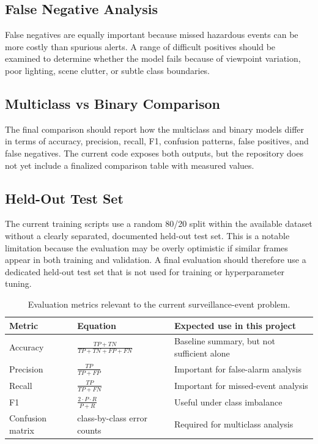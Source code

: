\documentclass[11pt,a4paper]{article}
\begin{document}
\subsection{False Negative Analysis}
False negatives are equally important because missed hazardous events can be more costly than spurious alerts. A range of difficult positives should be examined to determine whether the model fails because of viewpoint variation, poor lighting, scene clutter, or subtle class boundaries.

\subsection{Multiclass vs Binary Comparison}
The final comparison should report how the multiclass and binary models differ in terms of accuracy, precision, recall, F1, confusion patterns, false positives, and false negatives. The current code exposes both outputs, but the repository does not yet include a finalized comparison table with measured values.

\subsection{Held-Out Test Set}
The current training scripts use a random 80/20 split within the available dataset without a clearly separated, documented held-out test set. This is a notable limitation because the evaluation may be overly optimistic if similar frames appear in both training and validation. A final evaluation should therefore use a dedicated held-out test set that is not used for training or hyperparameter tuning.

\begin{table}[h]
\centering
\begin{tabular}{p{4cm}p{5cm}p{4.5cm}}
\toprule
Metric & Equation & Expected use in this project \\
\midrule
Accuracy & $\frac{TP + TN}{TP + TN + FP + FN}$ & Baseline summary, but not sufficient alone \\
Precision & $\frac{TP}{TP + FP}$ & Important for false-alarm analysis \\
Recall & $\frac{TP}{TP + FN}$ & Important for missed-event analysis \\
F1 & $\frac{2 \cdot P \cdot R}{P + R}$ & Useful under class imbalance \\
Confusion matrix & class-by-class error counts & Required for multiclass analysis \\
\bottomrule
\end{tabular}
\caption{Evaluation metrics relevant to the current surveillance-event problem.}
\label{tab:eval-metrics}
\end{table}
\end{document}
